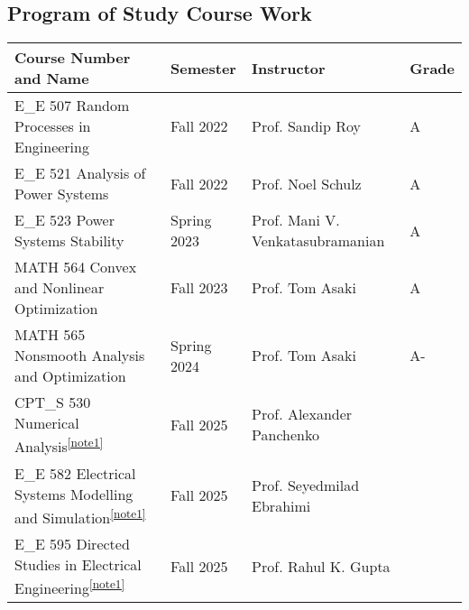 \subsection{Program of Study Course Work}
\begin{table}[h!]
\centering
\setlength{\tabcolsep}{4pt}
\label{tab:my-table}
\begin{adjustbox}{width=1\textwidth,center=\textwidth}
\begin{tabular}{@{}l|l|l|l@{}}
\toprule
Course Number and Name                          & Semester       & Instructor                     & Grade \\ \midrule

E\_E 507 Random Processes in Engineering        & Fall 2022      & Prof. Sandip Roy               & A    \\
E\_E 521 Analysis of Power Systems              & Fall 2022      & Prof. Noel Schulz              & A    \\
E\_E 523 Power Systems Stability                & Spring 2023    & Prof. Mani V. Venkatasubramanian & A   \\
MATH 564 Convex and Nonlinear Optimization      & Fall 2023      & Prof. Tom Asaki                & A    \\
MATH 565 Nonsmooth Analysis and Optimization    & Spring 2024    & Prof. Tom Asaki                & A-   \\
CPT\_S 530 Numerical Analysis\textsuperscript{\ref{note1}} & Fall 2025 & Prof. Alexander Panchenko & \\
E\_E 582 Electrical Systems Modelling and Simulation\textsuperscript{\ref{note1}} & Fall 2025 & Prof. Seyedmilad Ebrahimi & \\

E\_E 595 Directed Studies in Electrical Engineering\textsuperscript{\ref{note1}} & Fall 2025 & Prof. Rahul K. Gupta & \\ \bottomrule
\end{tabular}
\end{adjustbox}


\end{table}

